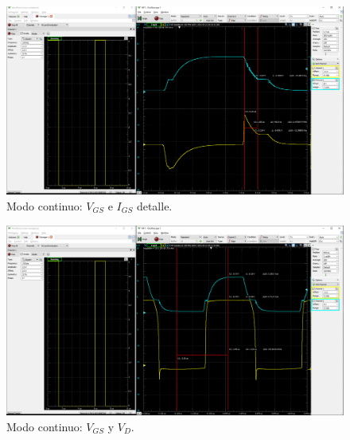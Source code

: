 \begin{figure}[H]
	\centering
	\includegraphics[width=\linewidth]{Imagenes/Continuo_VGS_IG_2}
	\caption{Modo continuo: $V_{GS}$ e $I_{GS}$ detalle.}
	\label{fig:CONT_VGS_IGS_2}
\end{figure}

\begin{figure}[H]
	\centering
	\includegraphics[width=\linewidth]{Imagenes/Continuo_VGS_VDiodo}
	\caption{Modo continuo: $V_{GS}$ y $V_D$.}
	\label{fig:CONT_VGS_VD}
\end{figure}


